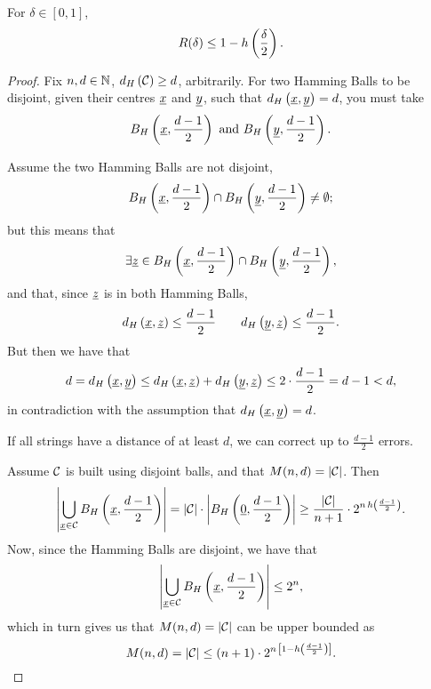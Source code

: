 \begin{thm}
	For $\delta \in [0, 1]$,
	\begin{equation*}
		R(\delta) \le 1 - h\left({\frac{\delta}{2}}\right).
	\end{equation*}
\end{thm}

\begin{proof}
	Fix $n, d \in \mathbb{N}$, $d_H \left({\mathcal{C}}\right) \ge d$, arbitrarily.
	For two Hamming Balls to be disjoint, given their centres $\underline{x}$ and $\underline{y}$, such that $d_H \left({\underline{x}, \underline{y}}\right) = d$, you must take 
	\begin{equation*}
		B_H\left(\underline{x}, \frac{d-1}{2}\right)
		\text{ and }
		B_H\left(\underline{y}, \frac{d-1}{2}\right).
	\end{equation*}

	Assume the two Hamming Balls are not disjoint, \ie
	\begin{equation*}
		B_H\left(\underline{x}, \frac{d-1}{2}\right)
		\cap
		B_H\left(\underline{y}, \frac{d-1}{2}\right)
		\neq \emptyset;
	\end{equation*}
	but this means that
	\begin{equation*}
		\exists \underline{z} \in
		B_H\left(\underline{x}, \frac{d-1}{2}\right)
		\cap
		B_H\left(\underline{y}, \frac{d-1}{2}\right),
	\end{equation*}
	and that, since $\underline{z}$ is in both Hamming Balls,
	\begin{equation*}
		d_H \left({\underline{x},\underline{z}}\right) \le \frac{d-1}{2}
		\qquad
		d_H \left({\underline{y},\underline{z}}\right) \le \frac{d-1}{2}.
	\end{equation*}
	But then we have that
	\begin{equation*}
		d = d_H \left({\underline{x},\underline{y}}\right)
		\le
		d_H \left({\underline{x},\underline{z}}\right) + d_H \left({\underline{y},\underline{z}}\right)
		\le
		2 \cdot \frac{d-1}{2}
		= d-1 < d,
	\end{equation*}
	in contradiction with the assumption that $d_H \left({\underline{x},\underline{y}}\right) = d$.

	If all strings have a distance of at least $d$, we can correct up to $\frac{d-1}{2}$ errors.

	Assume $\mathcal{C}$ is built using disjoint balls, and that $M(n, d) = \left|{\mathcal{C}}\right|$.
	Then
	\begin{equation*}
		\left|{\bigcup_{\underline{x} \in \mathcal{C}} B_H\left(\underline{x}, \frac{d-1}{2}\right)}\right|
		=
		\left|{\mathcal{C}}\right| \cdot \left|{B_H\left(\underline{0}, \frac{d-1}{2}\right)}\right|
		\ge
		\frac{\left|{\mathcal{C}}\right|}{n+1} \cdot 2^{n \, h\left({\frac{d-1}{2}}\right)}.
	\end{equation*}
	Now, since the Hamming Balls are disjoint, we have that
	\begin{equation*}
		\left|{\bigcup_{\underline{x} \in \mathcal{C}} B_H\left(\underline{x}, \frac{d-1}{2}\right)}\right| \le 2^n,
	\end{equation*}
	which in turn gives us that $M(n,d) = \left|{\mathcal{C}}\right|$ can be upper bounded as
	\begin{equation*}
		M(n, d) = \left|{\mathcal{C}}\right| \le (n+1) \cdot 2^{n \, \left[1 - h\left({\frac{d-1}{2}}\right)\right]}.
	\end{equation*}
	

\end{proof}
